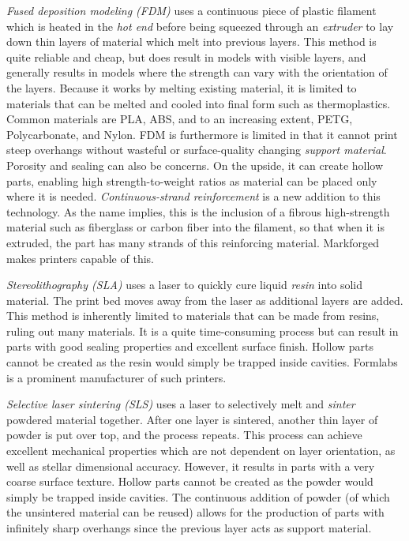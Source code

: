  	\begin{asparaenum}[a)]
 		\item \textit{Fused deposition modeling (FDM)} uses a continuous piece of plastic filament which is heated in the \textit{hot end} before being squeezed through an \textit{extruder} to lay down thin layers of material which melt into previous layers. This method is quite reliable and cheap, but does result in models with visible layers, and generally results in models where the strength can vary with the orientation of the layers.
 		Because it works by melting existing material, it is limited to materials that can be melted and cooled into final form such as thermoplastics. Common materials are PLA, ABS, and to an increasing extent, PETG, Polycarbonate, and Nylon. FDM is furthermore is limited in that it cannot print steep overhangs without wasteful or surface-quality changing \textit{support material}. Porosity and sealing can also be concerns. On the upside, it can create hollow parts, enabling high strength-to-weight ratios as material can be placed only where it is needed.
 		\textit{Continuous-strand reinforcement} is a new addition to this technology. As the name implies, this is the inclusion of a fibrous high-strength material such as fiberglass or carbon fiber into the filament, so that when it is extruded, the part has many strands of this reinforcing material. Markforged makes printers capable of this.
 		\item \textit{Stereolithography (SLA)} uses a laser to quickly cure liquid \textit{resin} into solid material. The print bed moves away from the laser as additional layers are added. This method is inherently limited to materials that can be made from resins, ruling out many materials. It is a quite time-consuming process but can result in parts with good sealing properties and excellent surface finish. Hollow parts cannot be created as the resin would simply be trapped inside cavities. Formlabs is a prominent manufacturer of such printers.
 		\item \textit{Selective laser sintering (SLS)} uses a laser to selectively melt and \textit{sinter} powdered material together. After one layer is sintered, another thin layer of powder is put over top, and the process repeats. This process can achieve excellent mechanical properties which are not dependent on layer orientation, as well as stellar dimensional accuracy. However, it results in parts with a very coarse surface texture. Hollow parts cannot be created as the powder would simply be trapped inside cavities. The continuous addition of powder (of which the unsintered material can be reused) allows for the production of parts with infinitely sharp overhangs since the previous layer acts as support material.
 	\end{asparaenum}
 	
